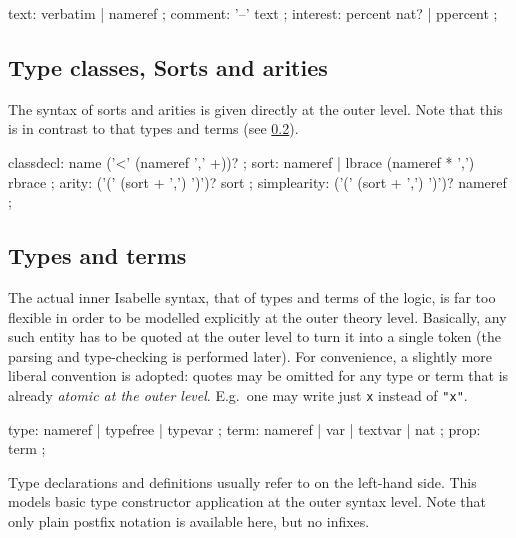\begin{rail}
  text: verbatim | nameref
  ;
  comment: '--' text
  ;
  interest: percent nat? | ppercent
  ;
\end{rail}


\subsection{Type classes, Sorts and arities}

The syntax of sorts and arities is given directly at the outer level.  Note
that this is in contrast to that types and terms (see \ref{sec:types-terms}).

\begin{rail}
  classdecl: name ('<' (nameref ',' +))?
  ;
  sort: nameref | lbrace (nameref * ',') rbrace
  ;
  arity: ('(' (sort + ',') ')')? sort
  ;
  simplearity: ('(' (sort + ',') ')')? nameref
  ;
\end{rail}


\subsection{Types and terms}\label{sec:types-terms}

The actual inner Isabelle syntax, that of types and terms of the logic, is far
too flexible in order to be modelled explicitly at the outer theory level.
Basically, any such entity has to be quoted at the outer level to turn it into
a single token (the parsing and type-checking is performed later).  For
convenience, a slightly more liberal convention is adopted: quotes may be
omitted for any type or term that is already \emph{atomic at the outer level}.
E.g.\ one may write just \texttt{x} instead of \texttt{"x"}.

\begin{rail}
  type: nameref | typefree | typevar
  ;
  term: nameref | var | textvar | nat
  ;
  prop: term
  ;
\end{rail}

Type declarations and definitions usually refer to  on
the left-hand side.  This models basic type constructor application at the
outer syntax level.  Note that only plain postfix notation is available here,
but no infixes.

